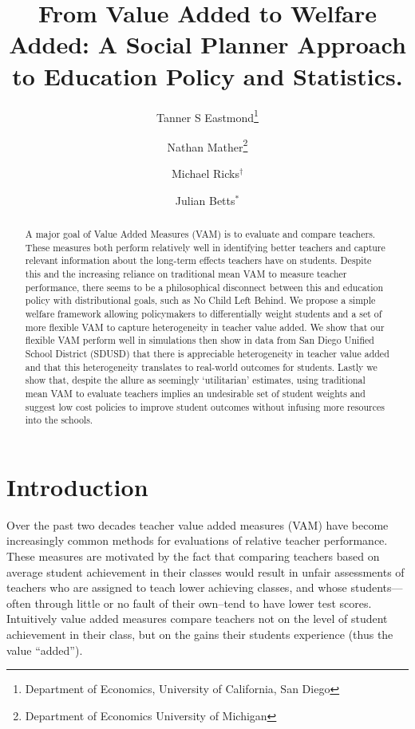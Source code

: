 \documentclass[letterpaper,12pt]{article}
\title{From Value Added to Welfare Added: A Social Planner Approach to Education Policy and Statistics.}
\author{Tanner S Eastmond\thanks{Department of Economics, University of California, San Diego} \and Nathan Mather\thanks{Department of Economics University of Michigan} \and Michael Ricks$^\dagger$ \and Julian Betts$^*$}
\date{\vspace{-8ex}}
\begin{document}
\maketitle





\begin{abstract}
    A major goal of Value Added Measures (VAM) is to evaluate and compare teachers. These measures both perform relatively well in identifying better teachers and capture relevant information about the long-term effects teachers have on students. Despite this and the increasing reliance on traditional mean VAM to measure teacher performance, there seems to be a philosophical disconnect between this and education policy with distributional goals, such as No Child Left Behind. We propose a simple welfare framework allowing policymakers to differentially weight students and a set of more flexible VAM to capture heterogeneity in teacher value added. We show that our flexible VAM perform well in simulations then show in data from San Diego Unified School District (SDUSD) that there is appreciable heterogeneity in teacher value added and that this heterogeneity translates to real-world outcomes for students. Lastly we show that, despite the allure as seemingly `utilitarian' estimates, using traditional mean VAM to evaluate teachers implies an undesirable set of student weights and suggest low cost policies to improve student outcomes without infusing more resources into the schools.
\end{abstract}





\section{Introduction}

Over the past two decades teacher value added measures (VAM) have become increasingly common methods for evaluations of relative teacher performance. These measures are motivated by the fact that comparing teachers based on average student achievement in their classes would result in unfair assessments of teachers who are assigned to teach lower achieving classes, and whose students---often through little or no fault of their own--tend to have lower test scores. Intuitively value added measures compare teachers not on the level of student achievement in their class, but on the gains their students experience (thus the value ``added'').
\end{document}
